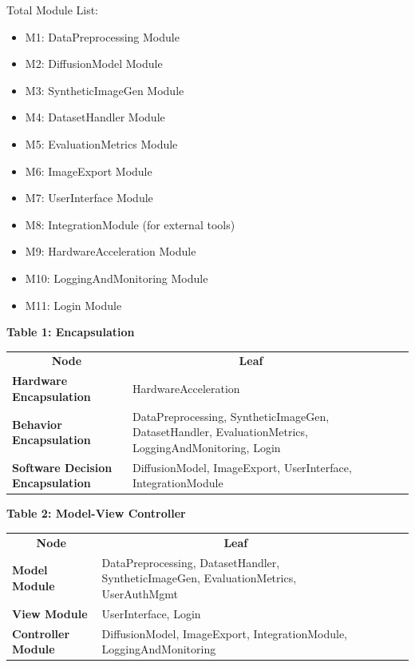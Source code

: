 \documentclass[12pt, titlepage]{article}
\begin{document}
Total Module List:
\begin{itemize}
  \item M1: DataPreprocessing Module
  \item M2: DiffusionModel Module
  \item M3: SyntheticImageGen Module
  \item M4: DatasetHandler Module
  \item M5: EvaluationMetrics Module
  \item M6: ImageExport Module
  \item M7: UserInterface Module
  \item M8: IntegrationModule (for external tools)
  \item M9: HardwareAcceleration Module
  \item M10: LoggingAndMonitoring Module
  \item M11: Login Module
\end{itemize}

\textbf{Table 1: Encapsulation}
\begin{table}[H]
  \begin{tabular}{lllll}
  \multicolumn{1}{c}{\textbf{Node}} & \multicolumn{1}{c}{\textbf{Leaf}} &  &  &  \\
  \textbf{Hardware Encapsulation} & HardwareAcceleration &  &  &  \\
  \textbf{Behavior Encapsulation} & DataPreprocessing, SyntheticImageGen, DatasetHandler, EvaluationMetrics, LoggingAndMonitoring, Login &  &  &  \\
  \textbf{Software Decision Encapsulation} & DiffusionModel, ImageExport, UserInterface, IntegrationModule &  &  & 
  \end{tabular}
\end{table}

\textbf{Table 2: Model-View Controller}
\begin{table}[H]
  \begin{tabular}{lllll}
  \multicolumn{1}{c}{\textbf{Node}} & \multicolumn{1}{c}{\textbf{Leaf}} &  &  &  \\
  \textbf{Model Module} & DataPreprocessing, DatasetHandler, SyntheticImageGen, EvaluationMetrics, UserAuthMgmt &  &  &  \\
  \textbf{View Module} & UserInterface, Login &  &  &  \\
  \textbf{Controller Module} & DiffusionModel, ImageExport, IntegrationModule, LoggingAndMonitoring &  &  & 
  \end{tabular}
\end{table}
\end{document}

